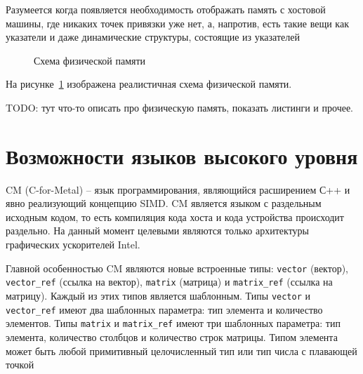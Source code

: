 Разумеется когда появляется необходимость отображать память с хостовой машины, где никаких точек привязки уже нет, а, напротив, есть такие вещи как указатели и даже динамические структуры, состоящие из указателей


\begin{figure}[ht]
    \caption{Схема физической памяти}\label{fig:memory-scheme}
\end{figure}

На рисунке~\ref{fig:memory-scheme} изображена реалистичная схема физической памяти.

TODO: тут что-то описать про физическую память, показать листинги и прочее.

\section{Возможности языков высокого уровня}\label{sec:overview/hll}

CM (C-for-Metal) -- язык программирования, являющийся расширением С++ и явно реализующий концепцию SIMD. CM является языком с раздельным исходным кодом, то есть компиляция кода хоста и кода устройства происходит раздельно. На данный момент целевыми являются только архитектуры графических ускорителей Intel.

Главной особенностью CM являются новые встроенные типы: \texttt{vector} (вектор), \texttt{vector\_ref} (ссылка на вектор), \texttt{matrix} (матрица) и \texttt{matrix\_ref} (ссылка на матрицу). Каждый из этих типов является шаблонным. Типы \texttt{vector} и \texttt{vector\_ref} имеют два шаблонных параметра: тип элемента и количество элементов. Типы \texttt{matrix} и \texttt{matrix\_ref} имеют три шаблонных
параметра: тип элемента, количество столбцов и количество строк матрицы. Типом элемента может быть любой примитивный целочисленный тип или тип числа с плавающей точкой

\FloatBarrier
